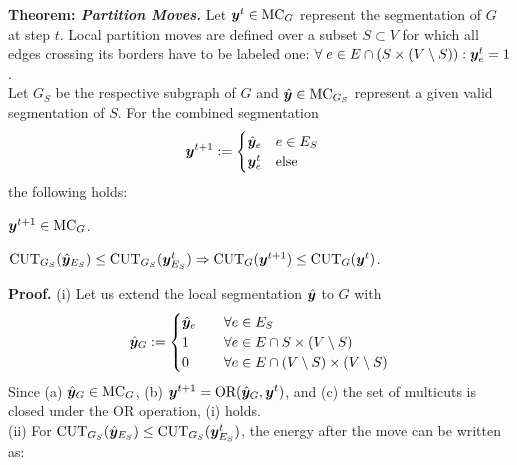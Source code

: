 \vspace*{0.3cm}
\noindent\textbf{Theorem: \emph{Partition Moves.}}
%
Let $\boldsymbol y^t \in \text{MC}_G$ represent the segmentation of $G$ at step $t$.
Local partition moves are defined over a subset $S \subset V$ for which all
edges crossing its borders have to be labeled one:
$\forall\;e\in E\cap (S\times(V\setminus S)): \boldsymbol y_e^t = 1$.\\
%
Let $G_S$ be the respective subgraph of $G$ and
$\hat{\boldsymbol y} \in \text{MC}_{G_S}$ represent a given valid segmentation of $S$. 
For the combined segmentation
%
\begin{align}
{
\y^{t+1} := \begin{cases}
                  \hat{\y}_e \quad e\in E_S  \\
                  \y_e^t \quad \text{else} 
            \end{cases}%
            \label{eq:y_t_plus_one}
}%
\end{align}
the following holds:\\
\begin{inparaenum}[(i)]
\item
{
$\boldsymbol y^{t+1} \in \text{MC}_G$.\\
}
\item
{
$\text{CUT}_{G_S}(\hat{\boldsymbol y}_{E_S}) \leq \text{CUT}_{G_S}({\boldsymbol y}_{E_S}^t) \Rightarrow
\text{CUT}_{G}({\boldsymbol y}^{t+1}) \leq \text{CUT}_{G}({\boldsymbol y}^t)$.}
\end{inparaenum}

\vspace*{0.2cm}
\noindent\textbf{Proof.}
(i)
Let us extend the local segmentation $\hat{\boldsymbol y}$ to $G$ with
\begin{align*}
{
\hat{\y}_G := \begin{cases}
                  \hat{\y}_e \quad &\forall e\in E_S\\
                  1          \quad &\forall e\in E \cap S\times (V\setminus S)\\
                  0          \quad &\forall e\in E \cap (V\setminus S)\times(V\setminus S)
            \end{cases}%
}%
\end{align*}
%
Since (a) 
$\hat{\boldsymbol y}_G \in \text{MC}_G$,
(b)
$\boldsymbol y^{t+1} = \text{OR}(\hat{\boldsymbol y}_G, \boldsymbol y^t)$,
and (c) the 
set of multicuts is closed under the OR operation, (i) holds.\\
%
(ii)
For
$\text{CUT}_{G_S}(\hat{\boldsymbol y}_{E_S}) \leq \text{CUT}_{G_S}({\boldsymbol y}_{E_S}^t)$,
the energy after the move can be written as:



